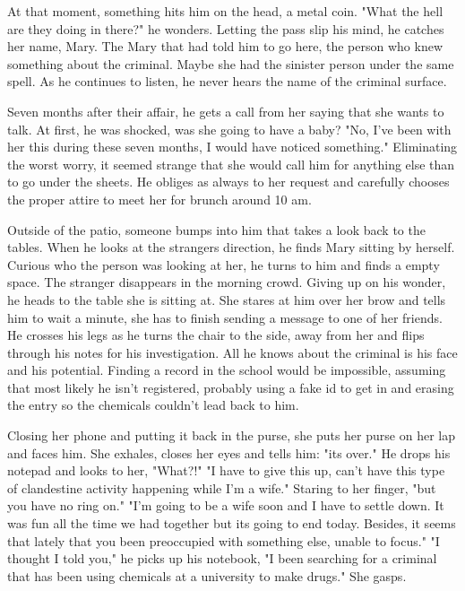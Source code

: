         At that moment, something hits him on the head, a metal coin. "What the hell are they doing in there?" he wonders. Letting the pass
    slip his mind, he catches her name, Mary. The Mary that had told him to go here, the person who knew something about the criminal. Maybe
    she had the sinister person under the same spell. As he continues to listen, he never hears the name of the criminal surface.

        Seven months after their affair, he gets a call from her saying that she wants to talk. At first, he was shocked, was she going to
    have a baby? "No, I've been with her this during these seven months, I would have noticed something." Eliminating the worst worry, it
    seemed strange that she would call him for anything else than to go under the sheets. He obliges as always to her request and carefully
    chooses the proper attire to meet her for brunch around 10 am.

        Outside of the patio, someone bumps into him that takes a look back to the tables. When he looks at the strangers direction, he finds
    Mary sitting by herself. Curious who the person was looking at her, he turns to him and finds a empty space. The stranger disappears in the
    morning crowd. Giving up on his wonder, he heads to the table she is sitting at. She stares at him over her brow and tells him to wait a
    minute, she has to finish sending a message to one of her friends. He crosses his legs as he turns the chair to the side, away from her
    and flips through his notes for his investigation. All he knows about the criminal is his face and his potential. Finding a record in the
    school would be impossible, assuming that most likely he isn't registered, probably using a fake id to get in and erasing the entry so
    the chemicals couldn't lead back to him.

        Closing her phone and putting it back in the purse, she puts her purse on her lap and faces him. She exhales, closes her eyes and tells
    him: "its over." He drops his notepad and looks to her, "What?!" "I have to give this up, can't have this type of clandestine activity 
    happening while I'm a wife."  Staring to her finger, "but you have no ring on." "I'm going to be a wife soon and I have to settle down. It
    was fun all the time we had together but its going to end today. Besides, it seems that lately that you been preoccupied with something else,
    unable to focus." "I thought I told you," he picks up his notebook, "I been searching for a criminal that has been using chemicals at a
    university to make drugs." She gasps.

